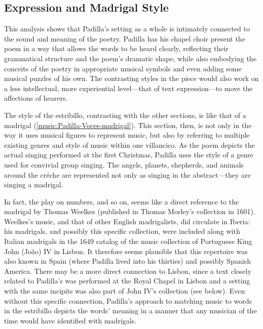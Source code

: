 \subsection{Expression and Madrigal Style}

This analysis shows that Padilla's setting as a whole is intimately connected to
the sound and meaning of the poetry.
Padilla has his chapel choir present the poem in a way that allows the words to
be heard clearly, reflecting their grammatical structure and the poem's dramatic
shape, while also embodying the conceits of the poetry in appropriate musical
symbols and even adding some musical puzzles of his own.
The contrasting styles in the piece would also work on a less intellectual, more
experiential level---that of text expression---to move the affections of
hearers.

The style of the estribillo, contrasting with the other sections, is like that
of a madrigal (\cref{music:Padilla-Voces-madrigal}).
This section, then, is  not only in the way it uses
musical figures to represent music, but also by referring to multiple existing
genres and style of music within one villancico.
As the poem depicts the actual singing performed at the first Christmas, Padilla
uses the style of a genre used for convivial group singing.
The angels, planets, shepherds, and animals around the créche are represented
not only as singing in the abstract---they are singing a madrigal.

In fact, the play on numbers,  and so on, seems like a
direct reference to the madrigal 
by Thomas Weelkes (published in Thomas Morley's collection  in 1601).
Weelkes's music, and that of other English madrigalists, did circulate in
Iberia: his madrigals, and possibly this specific collection, were included
along with Italian madrigals in the 1649 catalog of the music collection of
Portuguese King John (João) IV in Lisbon.%
    \Autocite[no.~559, 584]{JohnIV:Catalog}
It therefore seems plausible that this repertoire was also known in Spain (where
Padilla lived into his thirties) and possibly Spanish America.
There may be a more direct connection to Lisbon, since a text closely related to
Padilla's  was performed at the Royal Chapel in Lisbon and a
setting with the same incipits was also part of John IV's collection (see
below).
Even without this specific connection, Padilla's approach to matching music to
words in the estribillo depicts the words' meaning in a manner that any musician
of the time would have identified with madrigals.

